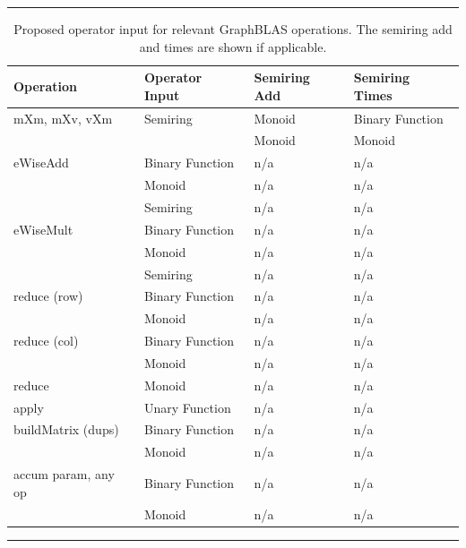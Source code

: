 \begin{table}
    \hrule
    \begin{center}
        \caption{Proposed operator input for relevant GraphBLAS operations. 
        The semiring add and times are shown if applicable.}
        \label{Tab:OperatorInputType}
        \begin{tabular}{l|l|l|l}
        Operation           & Operator Input  & Semiring Add & Semiring Times  \\ \hline
        {\sf mXm, mXv, vXm} & Semiring        & Monoid       & Binary Function \\
                            &                 & Monoid       & Monoid \\
        {\sf eWiseAdd}      & Binary Function & n/a          & n/a  \\
                            & Monoid          & n/a          & n/a  \\
                            & Semiring        & n/a          & n/a  \\
        {\sf eWiseMult}     & Binary Function & n/a          & n/a  \\
                            & Monoid          & n/a          & n/a  \\
                            & Semiring        & n/a          & n/a  \\
        {\sf reduce} (row)  & Binary Function & n/a          & n/a  \\
                            & Monoid          & n/a          & n/a  \\
        {\sf reduce} (col)  & Binary Function & n/a          & n/a  \\
                            & Monoid          & n/a          & n/a  \\
        {\sf reduce}        & Monoid          & n/a          & n/a  \\
        {\sf apply}         & Unary Function  & n/a          & n/a  \\
  {\sf buildMatrix} (dups)  & Binary Function & n/a          & n/a  \\
                            & Monoid          & n/a          & n/a  \\
{\sf accum} param, any op   & Binary Function & n/a          & n/a  \\
                            & Monoid          & n/a          & n/a  \\
        \end{tabular}
    \end{center}
    \hrule
\end{table}

